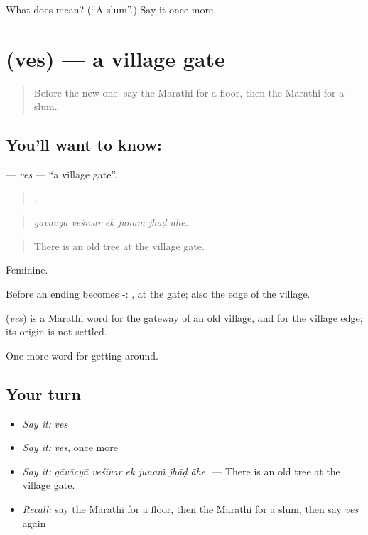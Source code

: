 \begin{tcolorbox}[breakable,colback=teal!4,colframe=teal!35!black,title={Before you move on}]
What does  mean? (\textquotedblleft{}A slum\textquotedblright{}.) Say it once more.
\end{tcolorbox}
\section[\texorpdfstring{\mr{वेस} (ves)}{वेस (ves)}]{ (ves) — a village gate}

\label{lesson:MR-C421-ves}



\begin{quote}
Before the new one: say the Marathi for a floor, then the Marathi for a slum.
\end{quote}

\subsection*{You'll want to know: }
\textbf{} — \emph{ves} — \textquotedblleft{}a village gate\textquotedblright{}.

\begin{quote}
     .
\end{quote}

\begin{quote}
\emph{gāvācyā veśīvar ek junaṁ jhāḍ āhe.}
\end{quote}

\begin{quote}
There is an old tree at the village gate.
\end{quote}

Feminine.

Before an ending  becomes -: , at the gate; also the edge of the village.

\begin{cousinweb}
\textbf{} (\emph{ves}) is a Marathi word for the gateway of an old village, and for the village edge; its origin is not settled.
\end{cousinweb}

\begin{grammarlens}[title={What you've built}]
One more word for getting around.
\end{grammarlens}

\subsection*{Your turn}
\begin{itemize}
\raggedright
  \item \emph{Say it:} \emph{ves}
  \item \emph{Say it:} \emph{ves}, once more
  \item \emph{Say it:} \emph{gāvācyā veśīvar ek junaṁ jhāḍ āhe.} — There is an old tree at the village gate.
  \item \emph{Recall:} say the Marathi for a floor, then the Marathi for a slum, then say \emph{ves} again
\end{itemize}

